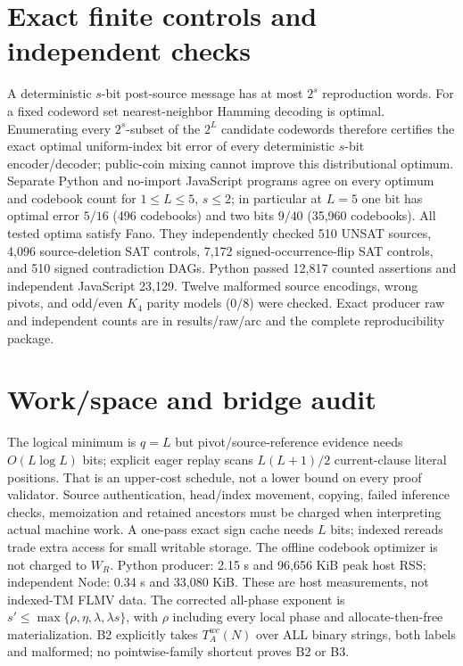 \documentclass[11pt]{article}
\begin{document}
\section*{Exact finite controls and independent checks}
A deterministic $s$-bit post-source message has at most $2^s$ reproduction words. For a fixed codeword set nearest-neighbor Hamming decoding is optimal. Enumerating every $2^s$-subset of the $2^L$ candidate codewords therefore certifies the exact optimal uniform-index bit error of every deterministic $s$-bit encoder/decoder; public-coin mixing cannot improve this distributional optimum. Separate Python and no-import JavaScript programs agree on every optimum and codebook count for $1\le L\le5$, $s\le2$; in particular at $L=5$ one bit has optimal error $5/16$ (496 codebooks) and two bits $9/40$ (35,960 codebooks). All tested optima satisfy Fano.
They independently checked 510 UNSAT sources, 4,096 source-deletion SAT controls, 7,172 signed-occurrence-flip SAT controls, and 510 signed contradiction DAGs. Python passed 12,817 counted assertions and independent JavaScript 23,129. Twelve malformed source encodings, wrong pivots, and odd/even $K_4$ parity models (0/8) were checked. Exact producer raw and independent counts are in results/raw/arc and the complete reproducibility package.
\section*{Work/space and bridge audit}
The logical minimum is $q=L$ but pivot/source-reference evidence needs $O(L\log L)$ bits; explicit eager replay scans $L(L+1)/2$ current-clause literal positions. That is an upper-cost schedule, not a lower bound on every proof validator. Source authentication, head/index movement, copying, failed inference checks, memoization and retained ancestors must be charged when interpreting actual machine work. A one-pass exact sign cache needs $L$ bits; indexed rereads trade extra access for small writable storage. The offline codebook optimizer is not charged to $W_R$.
Python producer: 2.15 s and 96,656 KiB peak host RSS; independent Node: 0.34 s and 33,080 KiB. These are host measurements, not indexed-TM FLMV data. The corrected all-phase exponent is $s'\le\max\{\rho,\eta,\lambda,\lambda s\}$, with $\rho$ including every local phase and allocate-then-free materialization. B2 explicitly takes $T_A^{wc}(N)$ over ALL binary strings, both labels and malformed; no pointwise-family shortcut proves B2 or B3.
\end{document}

